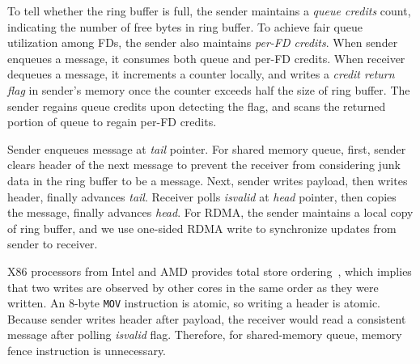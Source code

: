 To tell whether the ring buffer is full, the sender maintains a \textit{queue credits} count, indicating the number of free bytes in ring buffer.
To achieve fair queue utilization among FDs, the sender also maintains \emph{per-FD credits}.
When sender enqueues a message, it consumes both queue and per-FD credits. When receiver dequeues a message, it increments a counter locally, and writes a \textit{credit return flag} in sender's memory once the counter exceeds half the size of ring buffer. The sender regains queue credits upon detecting the flag, and scans the returned portion of queue to regain per-FD credits.

Sender enqueues message at \textit{tail} pointer. For shared memory queue, first, sender clears header of the next message to prevent the receiver from considering junk data in the ring buffer to be a message. Next, sender writes payload, then writes header, finally advances \textit{tail}. Receiver polls \textit{isvalid} at \textit{head} pointer, then copies the message, finally advances \textit{head}.
For RDMA, the sender maintains a local copy of ring buffer, and we use one-sided RDMA write to synchronize updates from sender to receiver.


X86 processors from Intel and AMD provides total store ordering~\cite{sewell2010x86,intel-manual}, which implies that two writes are observed by other cores in the same order as they were written. An 8-byte \texttt{MOV} instruction is atomic, so writing a header is atomic. Because sender writes header after payload, the receiver would read a consistent message after polling \textit{isvalid} flag. Therefore, for shared-memory queue, memory fence instruction is unnecessary.

